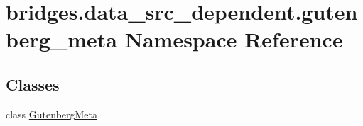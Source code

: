 \hypertarget{namespacebridges_1_1data__src__dependent_1_1gutenberg__meta}{}\section{bridges.\+data\+\_\+src\+\_\+dependent.\+gutenberg\+\_\+meta Namespace Reference}
\label{namespacebridges_1_1data__src__dependent_1_1gutenberg__meta}
\subsection*{Classes}
\begin{DoxyCompactItemize}
\item 
class \hyperlink{classbridges_1_1data__src__dependent_1_1gutenberg__meta_1_1_gutenberg_meta}{Gutenberg\+Meta}
\end{DoxyCompactItemize}
